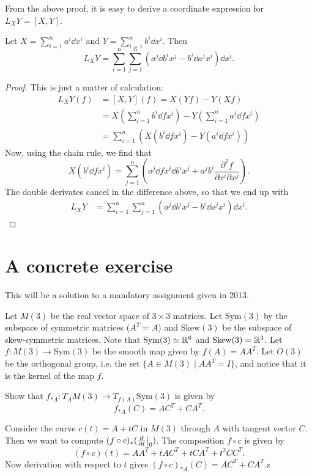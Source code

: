 \documentclass[11pt, english]{article}
\begin{document}
From the above proof, it is easy to derive a coordinate expression for $L_XY=[X,Y]$.
\begin{prop}
Let $X=\sum_{i=1}^n a^i \dd{}{x^i}$ and $Y=\sum_{i=1}^n b^i \dd{}{x^i}$. Then
\[
L_XY = \sum_{i=1}^n \sum_{j=1}^n \left( a^j \dd{b^i}{x^j}-b^i\dd{a^j}{x^i}\right) \dd{}{x^i}.
\]
\end{prop}
\begin{proof}
This is just a matter of calculation:
\begin{align*}
L_XY(f) &= [X,Y](f) = X(Yf)-Y(Xf) \\
&= X\left(\sum_{i=1}^n b^i \dd{f}{x^i}\right)-Y\left(\sum_{i=1}^n a^i \dd{f}{x^i}\right) \\
&= \sum_{i=1}^n \left(X\left( b^i \dd{f}{x^i}\right)-Y\left(a^i \dd{f}{x^i}\right) \right)
\end{align*}
Now, using the chain rule, we find that
\[
X\left( b^i \dd{f}{x^i} \right) = \sum_{j=1}^n\left( a^j \dd{f}{x^i}\dd{b^i}{x^j} + a^j b^i \frac{\partial^2 f}{\partial x^i \partial x^j}\right).
\]
The double derivates cancel in the difference above, so that we end up with
\begin{align*}
L_XY &= \sum_{i=1}^n \sum_{j=1}^n \left( a^j \dd{b^i}{x^j}-b^i \dd{a^j}{x^i}\right) \dd{}{x^i}.
\end{align*}

\end{proof}


\section{A concrete exercise}
This will be a solution to a mandatory assignment given in 2013. 

Let $M(3)$ be the real vector space of $3 \times 3$ matrices. Let $\mathrm{Sym}(3)$ by the subspace of symmetric matrices ($A^T=A$) and $\mathrm{Skew}(3)$ be the subspace of skew-symmetric matrices.  Note that $\mathrm{Sym}(3) \simeq \mathbb{R}^6$ and $\mathrm{Skew}(3)=\mathbb{R}^3$. Let $f:M(3) \to \mathrm{Sym}(3)$ be the smooth map given by $f(A)=AA^T$. Let $O(3)$ be the orthogonal group, i.e. the set $\{ A \in M(3) \mid A A^T=I \}$, and notice that it is the kernel of the map $f$. 

\begin{exc}
Show that $f_{\ast A}:T_AM(3) \to T_{f(A)}\mathrm{Sym}(3)$ is given by
\[
f_{\ast A}(C) = AC^T+CA^T.
\]
\end{exc}
\begin{sol}
Consider the curve $c(t)=A + tC$ in $M(3)$ through $A$ with tangent vector $C$. Then we want to compute $(f \circ c)_\ast (\restr{\dd{}{t}}{0})$. The composition $f \circ c$ is given by
\[
(f \circ c)(t) = AA^T+tAC^T+tCA^T+t^2CC^T.
\]
Now derivation with respect to $t$ gives $(f \circ c)_{\ast A}(C) = AC^T+CA^T$.z
\end{sol}
\end{document}
